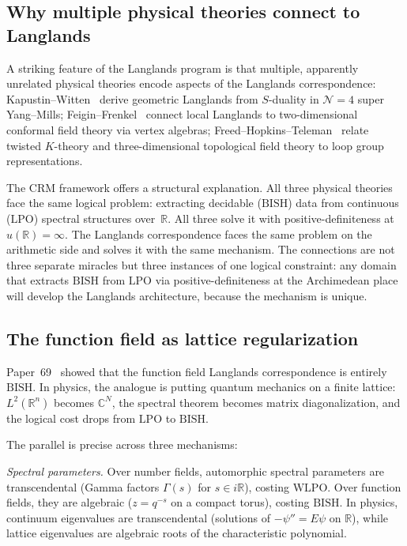 \documentclass[11pt]{article}
\theoremstyle{definition}
\theoremstyle{remark}
\newcommand{\R}{\mathbb{R}}
\newcommand{\C}{\mathbb{C}}
\newcommand{\BISH}{\mathrm{BISH}}
\newcommand{\LPO}{\mathrm{LPO}}
\newcommand{\WLPO}{\mathrm{WLPO}}
\begin{document}
\subsection{Why multiple physical theories connect to Langlands}
\label{sec:langlands-physics}

A striking feature of the Langlands program is that multiple, apparently unrelated physical theories encode aspects of the Langlands correspondence: Kapustin--Witten~\cite{KapustinWitten} derive geometric Langlands from $S$-duality in $\mathcal{N}=4$ super Yang--Mills; Feigin--Frenkel~\cite{FeiginFrenkel} connect local Langlands to two-dimensional conformal field theory via vertex algebras; Freed--Hopkins--Teleman~\cite{FHT} relate twisted $K$-theory and three-dimensional topological field theory to loop group representations.

The CRM framework offers a structural explanation. All three physical theories face the same logical problem: extracting decidable ($\BISH$) data from continuous ($\LPO$) spectral structures over~$\R$. All three solve it with positive-definiteness at $u(\R) = \infty$. The Langlands correspondence faces the same problem on the arithmetic side and solves it with the same mechanism. The connections are not three separate miracles but three instances of one logical constraint: any domain that extracts $\BISH$ from $\LPO$ via positive-definiteness at the Archimedean place will develop the Langlands architecture, because the mechanism is unique.

\subsection{The function field as lattice regularization}

Paper~69~\cite{Paper69} showed that the function field Langlands correspondence is entirely $\BISH$. In physics, the analogue is putting quantum mechanics on a finite lattice: $L^2(\R^n)$ becomes $\C^N$, the spectral theorem becomes matrix diagonalization, and the logical cost drops from $\LPO$ to $\BISH$.

The parallel is precise across three mechanisms:

\emph{Spectral parameters.} Over number fields, automorphic spectral parameters are transcendental (Gamma factors $\Gamma(s)$ for $s \in i\R$), costing $\WLPO$. Over function fields, they are algebraic ($z = q^{-s}$ on a compact torus), costing $\BISH$. In physics, continuum eigenvalues are transcendental (solutions of $-\psi'' = E\psi$ on $\R$), while lattice eigenvalues are algebraic roots of the characteristic polynomial.
\end{document}
